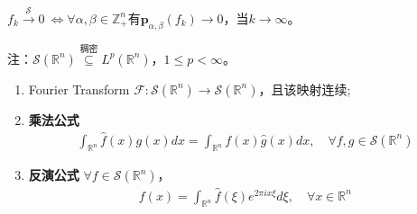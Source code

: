 \begin{definition}
    $f_k\xrightarrow{\mathcal{S}} 0\ \Longleftrightarrow \forall \alpha,\beta\in\mathbb{Z}_+^n$有$\boldsymbol{p}_{\alpha,\beta}(f_k)\to 0$，当$k\to\infty$。
\end{definition}
注：$\mathcal{S}(\mathbb{R}^n)\overset{\text{稠密}}{\subseteq} L^p(\mathbb{R}^n)$，$1\leqslant p<\infty$。

\begin{theorem}
    \begin{enumerate}[leftmargin=1cm, label=\arabic*]
        \item Fourier Transform $\mathscr{F}:\mathcal{S}(\mathbb{R}^n) \to \mathcal{S}(\mathbb{R}^n)$，且该映射连续;

        \item \textbf{乘法公式}
        \begin{align*}
            \int_{\mathbb{R}^n} \hat{f}(x) g(x) dx = \int_{\mathbb{R}^n} f(x) \hat{g}(x) dx, \quad \forall f,g\in\mathcal{S}(\mathbb{R}^n)
        \end{align*}

        \item \textbf{反演公式} $\forall f\in\mathcal{S}(\mathbb{R}^n)$，
        \begin{align*}
            f(x) = \int_{\mathbb{R}^n} \hat{f}(\xi) e^{2\pi i x \xi} d\xi, \quad \forall x\in\mathbb{R}^n
        \end{align*}
    \end{enumerate}
\end{theorem}
